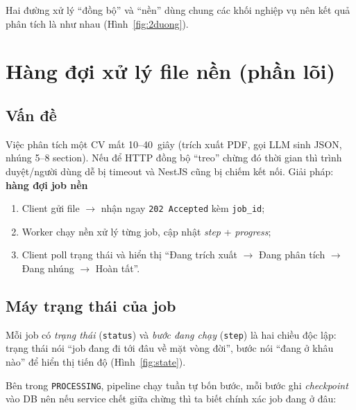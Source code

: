 \documentclass[a4paper,11pt]{article}
\begin{document}


Hai đường xử lý ``đồng bộ'' và ``nền'' dùng chung các khối nghiệp vụ nên kết quả phân
tích là như nhau (Hình~\ref{fig:2duong}).



\section{Hàng đợi xử lý file nền (phần lõi)}

\subsection{Vấn đề}

Việc phân tích một CV mất 10--40~giây (trích xuất PDF, gọi LLM sinh JSON, nhúng 5--8
section). Nếu để HTTP đồng bộ ``treo'' chừng đó thời gian thì trình duyệt/người dùng dễ
bị timeout và NestJS cũng bị chiếm kết nối. Giải pháp: \textbf{hàng đợi job nền}
\begin{enumerate}[leftmargin=1.6em]
  \item Client gửi file $\to$ nhận ngay \texttt{202 Accepted} kèm \texttt{job\_id};
  \item Worker chạy nền xử lý từng job, cập nhật \emph{step} + \emph{progress};
  \item Client poll trạng thái và hiển thị ``Đang trích xuất $\to$ Đang phân tích
        $\to$ Đang nhúng $\to$ Hoàn tất''.
\end{enumerate}

\subsection{Máy trạng thái của job}

Mỗi job có \emph{trạng thái} (\texttt{status}) và \emph{bước đang chạy}
(\texttt{step}) là hai chiều độc lập: trạng thái nói ``job đang đi tới đâu về mặt vòng
đời'', bước nói ``đang ở khâu nào'' để hiển thị tiến độ (Hình~\ref{fig:state}).



Bên trong \texttt{PROCESSING}, pipeline chạy tuần tự bốn bước, mỗi bước ghi \emph{checkpoint}
vào DB nên nếu service chết giữa chừng thì ta biết chính xác job đang ở đâu:


\end{document}
